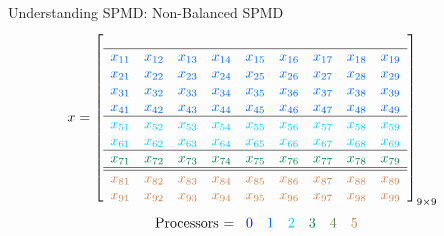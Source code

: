 \begin{frame}
\begin{exampleblock}{Understanding SPMD:  Non-Balanced SPMD}
\begin{align*}
x &= \left[
      \begin{array}{lllllllll}
      \\\hline
      \color{g12}x_{11} & \color{g12}x_{12} & \color{g12}x_{13} & \color{g12}x_{14} & \color{g12}x_{15} & \color{g12}x_{16} & \color{g12}x_{17} & \color{g12}x_{18} & \color{g12}x_{19}\\
      \color{g12}x_{21} & \color{g12}x_{22} & \color{g12}x_{23} & \color{g12}x_{24} & \color{g12}x_{25} & \color{g12}x_{26} & \color{g12}x_{27} & \color{g12}x_{28} & \color{g12}x_{29}\\
      \color{g12}x_{31} & \color{g12}x_{32} & \color{g12}x_{33} & \color{g12}x_{34} & \color{g12}x_{35} & \color{g12}x_{36} & \color{g12}x_{37} & \color{g12}x_{38} & \color{g12}x_{39}\\
      \color{g12}x_{41} & \color{g12}x_{42} & \color{g12}x_{43} & \color{g12}x_{44} & \color{g12}x_{45} & \color{g12}x_{46} & \color{g12}x_{47} & \color{g12}x_{48} & \color{g12}x_{49}\\\hline
      \color{g13}x_{51} & \color{g13}x_{52} & \color{g13}x_{53} & \color{g13}x_{54} & \color{g13}x_{55} & \color{g13}x_{56} & \color{g13}x_{57} & \color{g13}x_{58} & \color{g13}x_{59}\\
      \color{g13}x_{61} & \color{g13}x_{62} & \color{g13}x_{63} & \color{g13}x_{64} & \color{g13}x_{65} & \color{g13}x_{66} & \color{g13}x_{67} & \color{g13}x_{68} & \color{g13}x_{69}\\\hline
      \color{g21}x_{71} & \color{g21}x_{72} & \color{g21}x_{73} & \color{g21}x_{74} & \color{g21}x_{75} & \color{g21}x_{76} & \color{g21}x_{77} & \color{g21}x_{78} & \color{g21}x_{79}\\\hline\hline
      \color{g23}x_{81} & \color{g23}x_{82} & \color{g23}x_{83} & \color{g23}x_{84} & \color{g23}x_{85} & \color{g23}x_{86} & \color{g23}x_{87} & \color{g23}x_{88} & \color{g23}x_{89}\\
      \color{g23}x_{91} & \color{g23}x_{92} & \color{g23}x_{93} & \color{g23}x_{94} & \color{g23}x_{95} & \color{g23}x_{96} & \color{g23}x_{97} & \color{g23}x_{98} & \color{g23}x_{99}\\
      \end{array}
\right]_{9\times 9}
\end{align*}
\begin{align*}
\text{Processors = }
      \begin{array}{llllll}
      \color{g11}0 & \color{g12}1 & \color{g13}2 & \color{g21}3 & \color{g22}4 & \color{g23}5
      \end{array}
\end{align*}
\end{exampleblock}
\end{frame}

